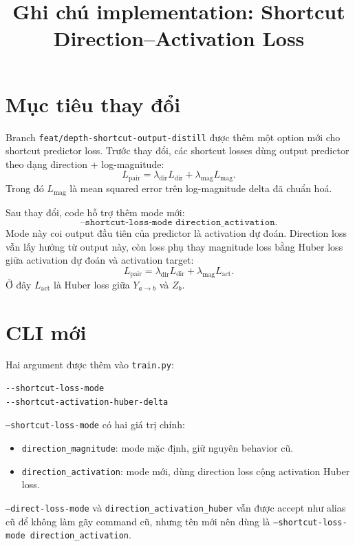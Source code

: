 \documentclass[11pt]{article}
\title{Ghi chú implementation: Shortcut Direction--Activation Loss}
\author{}
\date{}
\begin{document}
\maketitle

\section{Mục tiêu thay đổi}

Branch \texttt{feat/depth-shortcut-output-distill} được thêm một option mới cho shortcut predictor loss.
Trước thay đổi, các shortcut losses dùng output predictor theo dạng direction + log-magnitude:
\[
L_{\text{pair}}
=
\lambda_{\text{dir}} L_{\text{dir}}
+
\lambda_{\text{mag}} L_{\text{mag}}.
\]
Trong đó \(L_{\text{mag}}\) là mean squared error trên log-magnitude delta đã chuẩn hoá.

Sau thay đổi, code hỗ trợ thêm mode mới:
\[
\texttt{--shortcut-loss-mode direction\_activation}.
\]
Mode này coi output đầu tiên của predictor là activation dự đoán. Direction loss vẫn lấy hướng từ output này, còn loss phụ thay magnitude loss bằng Huber loss giữa activation dự đoán và activation target:
\[
L_{\text{pair}}
=
\lambda_{\text{dir}} L_{\text{dir}}
+
\lambda_{\text{mag}} L_{\text{act}}.
\]
Ở đây \(L_{\text{act}}\) là Huber loss giữa \(Y_{a \rightarrow b}\) và \(Z_b\).

\section{CLI mới}

Hai argument được thêm vào \texttt{train.py}:

\begin{verbatim}
--shortcut-loss-mode
--shortcut-activation-huber-delta
\end{verbatim}

\texttt{--shortcut-loss-mode} có hai giá trị chính:

\begin{itemize}
  \item \texttt{direction\_magnitude}: mode mặc định, giữ nguyên behavior cũ.
  \item \texttt{direction\_activation}: mode mới, dùng direction loss cộng activation Huber loss.
\end{itemize}

\texttt{--direct-loss-mode} và \texttt{direction\_activation\_huber} vẫn được accept như alias cũ để không làm gãy command cũ, nhưng tên mới nên dùng là \texttt{--shortcut-loss-mode direction\_activation}.
\end{document}
